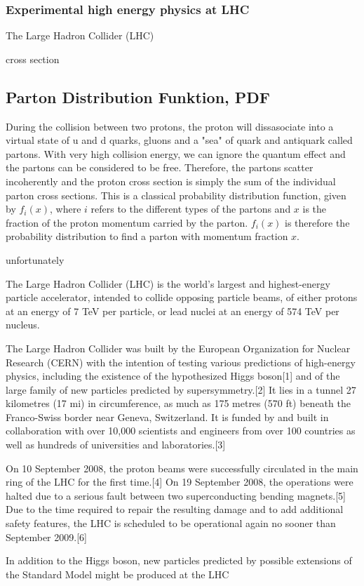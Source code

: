 \subsubsection{Experimental high energy physics at LHC}
The Large Hadron Collider (LHC) 


cross section




\subsection{Parton Distribution Funktion, PDF}
During the collision between two protons, the proton will dissasociate into a virtual state of u and d quarks, gluons and a "sea" of quark and antiquark called partons. With very high collision energy, we can ignore the quantum effect and the partons can be considered to be free. Therefore, the partons scatter incoherently and the proton cross section is simply the sum of the individual parton cross sections. This is a classical probability distribution function, given by $f_{i}(x)$, where $i$ refers to the different types of the partons and $x$ is the fraction of the proton momentum carried by the parton\cite{green2005hpp}. $f_{i}(x)$ is therefore the probability distribution to find a parton with momentum fraction $x$.


unfortunately





The Large Hadron Collider (LHC) is the world's largest and highest-energy particle accelerator, intended to collide opposing particle beams, of either protons at an energy of 7 TeV per particle, or lead nuclei at an energy of 574 TeV per nucleus.

The Large Hadron Collider was built by the European Organization for Nuclear Research (CERN) with the intention of testing various predictions of high-energy physics, including the existence of the hypothesized Higgs boson[1] and of the large family of new particles predicted by supersymmetry.[2] It lies in a tunnel 27 kilometres (17 mi) in circumference, as much as 175 metres (570 ft) beneath the Franco-Swiss border near Geneva, Switzerland. It is funded by and built in collaboration with over 10,000 scientists and engineers from over 100 countries as well as hundreds of universities and laboratories.[3]

On 10 September 2008, the proton beams were successfully circulated in the main ring of the LHC for the first time.[4] On 19 September 2008, the operations were halted due to a serious fault between two superconducting bending magnets.[5] Due to the time required to repair the resulting damage and to add additional safety features, the LHC is scheduled to be operational again no sooner than September 2009.[6]



In addition to the Higgs boson, new particles predicted by possible extensions of the Standard Model might be produced at the LHC

